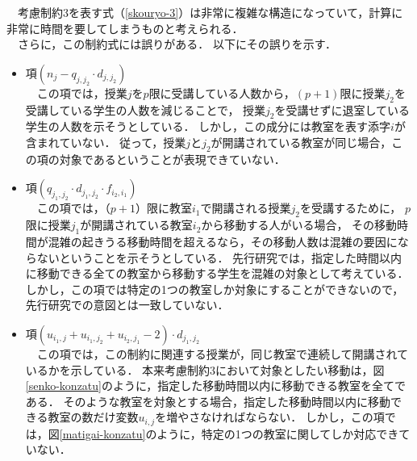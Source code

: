 \documentclass[12pt, a4paper, fleqn]{jreport}
\begin{document}
\begin{itemize}
　考慮制約3を表す式（\ref{skouryo-3}）は非常に複雑な構造になっていて，計算に非常に時間を要してしまうものと考えられる．\\

　さらに，この制約式には誤りがある．
以下にその誤りを示す．
\vspace{3.0mm}
\begin{itemize}
\item 項$(n_{j}-q_{j,j_2}\cdot d_{j,j_2})$\\

\vspace{-3.0mm}
　この項では，授業$j$を$p$限に受講している人数から，$(p+1)$限に授業$j_2$を受講している学生の人数を減じることで，
授業$j_2$を受講せずに退室している学生の人数を示そうとしている．
しかし，この成分には教室を表す添字$i$が含まれていない．
従って，授業$j$と$j_2$が開講されている教室が同じ場合，この項の対象であるということが表現できていない．
\vspace{3.0mm}
\item 項$(q_{j_1,j_2} \cdot d_{j_1,j_2} \cdot f_{i_2,i_1})$\\

\vspace{-3.0mm}
　この項では，（$p+1$）限に教室$i_1$で開講される授業$j_2$を受講するために，
$p$限に授業$j_1$が開講されている教室$i_2$から移動する人がいる場合，
その移動時間が混雑の起きうる移動時間を超えるなら，その移動人数は混雑の要因にならないということを示そうとしている．
先行研究では，指定した時間以内に移動できる全ての教室から移動する学生を混雑の対象として考えている．
しかし，この項では特定の1つの教室しか対象にすることができないので，先行研究での意図とは一致していない．
\vspace{3.0mm}
\item 項$(u_{i_1,j} + u_{i_1,j_2} + u_{i_2,j_1} - 2) \cdot d_{j_1,j_2}$\\

\vspace{-3.0mm}
　この項では，この制約に関連する授業が，同じ教室で連続して開講されているかを示している．
本来考慮制約3において対象としたい移動は，図\ref{senko-konzatu}のように，指定した移動時間以内に移動できる教室を全てである．
そのような教室を対象とする場合，指定した移動時間以内に移動できる教室の数だけ変数$u_{i,j}$を増やさなければならない．
しかし，この項では，図\ref{matigai-konzatu}のように，特定の1つの教室に関してしか対応できていない．


\end{itemize}
\end{itemize}
\end{document}
